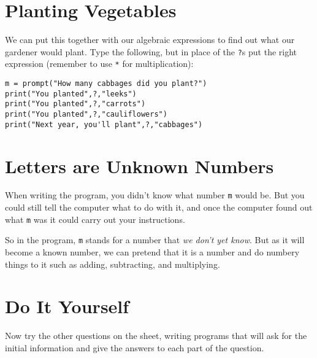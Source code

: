 \documentclass[
  xhtml,%
  text
]{internet}
\begin{document}
\section*{Planting Vegetables}

We can put this together with our algebraic expressions to find out what our gardener would plant.
Type the following, but in place of the \Verb+?+s put the right expression (remember to use \Verb+*+ for multiplication):

\begin{verbatim}
m = prompt("How many cabbages did you plant?")
print("You planted",?,"leeks")
print("You planted",?,"carrots")
print("You planted",?,"cauliflowers")
print("Next year, you'll plant",?,"cabbages")
\end{verbatim}

\section*{Letters are Unknown Numbers}

When writing the program, you didn't know what number \Verb+m+ would be.
But you could still tell the computer what to do with it, and once the computer found out what \Verb+m+ was it could carry out your instructions.

So in the program, \Verb+m+ stands for a number that \emph{we don't yet know}.
But as it will become a known number, we can pretend that it is a number and do numbery things to it such as adding, subtracting, and multiplying.

\section*{Do It Yourself}

Now try the other questions on the sheet, writing programs that will ask for the initial information and give the answers to each part of the question.
\end{document}
